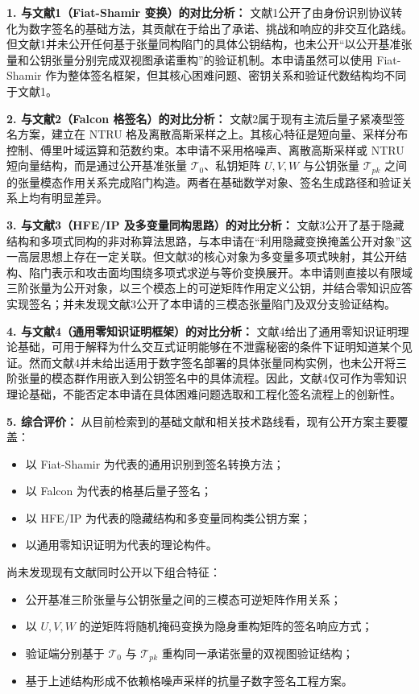 \documentclass[12pt,a4paper]{article}
\begin{document}
\textbf{1. 与文献1（Fiat-Shamir 变换）的对比分析：}
文献1公开了由身份识别协议转化为数字签名的基础方法，其贡献在于给出了承诺、挑战和响应的非交互化路线。但文献1并未公开任何基于张量同构陷门的具体公钥结构，也未公开“以公开基准张量和公钥张量分别完成双视图承诺重构”的验证机制。本申请虽然可以使用 Fiat-Shamir 作为整体签名框架，但其核心困难问题、密钥关系和验证代数结构均不同于文献1。

\textbf{2. 与文献2（Falcon 格签名）的对比分析：}
文献2属于现有主流后量子紧凑型签名方案，建立在 NTRU 格及离散高斯采样之上。其核心特征是短向量、采样分布控制、傅里叶域运算和范数约束。本申请不采用格噪声、离散高斯采样或 NTRU 短向量结构，而是通过公开基准张量 $\mathcal{T}_0$、私钥矩阵 $U,V,W$ 与公钥张量 $\mathcal{T}_{pk}$ 之间的张量模态作用关系完成陷门构造。两者在基础数学对象、签名生成路径和验证关系上均有明显差异。

\textbf{3. 与文献3（HFE/IP 及多变量同构思路）的对比分析：}
文献3公开了基于隐藏结构和多项式同构的非对称算法思路，与本申请在“利用隐藏变换掩盖公开对象”这一高层思想上存在一定关联。但文献3的核心对象为多变量多项式映射，其公开结构、陷门表示和攻击面均围绕多项式求逆与等价变换展开。本申请则直接以有限域三阶张量为公开对象，以三个模态上的可逆矩阵作用定义公钥，并结合零知识应答实现签名；并未发现文献3公开了本申请的三模态张量陷门及双分支验证结构。

\textbf{4. 与文献4（通用零知识证明框架）的对比分析：}
文献4给出了通用零知识证明理论基础，可用于解释为什么交互式证明能够在不泄露秘密的条件下证明知道某个见证。然而文献4并未给出适用于数字签名部署的具体张量同构实例，也未公开将三阶张量的模态群作用嵌入到公钥签名中的具体流程。因此，文献4仅可作为零知识理论基础，不能否定本申请在具体困难问题选取和工程化签名流程上的创新性。

\textbf{5. 综合评价：}
从目前检索到的基础文献和相关技术路线看，现有公开方案主要覆盖：
\begin{itemize}
    \item 以 Fiat-Shamir 为代表的通用识别到签名转换方法；
    \item 以 Falcon 为代表的格基后量子签名；
    \item 以 HFE/IP 为代表的隐藏结构和多变量同构类公钥方案；
    \item 以通用零知识证明为代表的理论构件。
\end{itemize}

尚未发现现有文献同时公开以下组合特征：
\begin{itemize}
    \item 公开基准三阶张量与公钥张量之间的三模态可逆矩阵作用关系；
    \item 以 $U,V,W$ 的逆矩阵将随机掩码变换为隐身重构矩阵的签名响应方式；
    \item 验证端分别基于 $\mathcal{T}_0$ 与 $\mathcal{T}_{pk}$ 重构同一承诺张量的双视图验证结构；
    \item 基于上述结构形成不依赖格噪声采样的抗量子数字签名工程方案。
\end{itemize}
\end{document}
